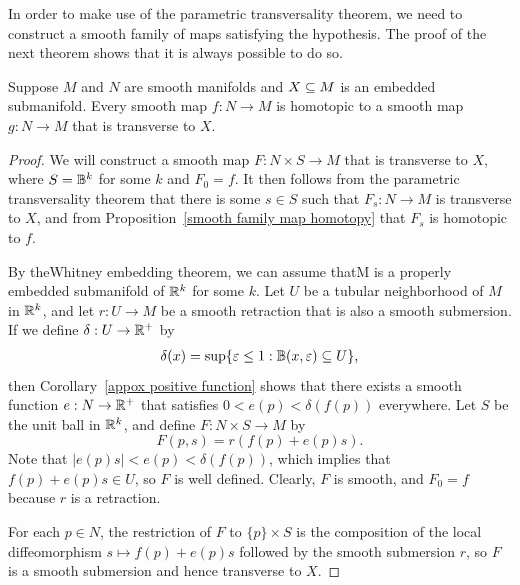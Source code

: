 In order to make use of the parametric transversality theorem, we need to construct
a smooth family of maps satisfying the hypothesis. The proof of the next
theorem shows that it is always possible to do so.
\begin{theorem}
Suppose $M$ and $N$ are smooth manifolds and $X\subseteq M$ is an embedded submanifold. Every smooth map $f:N\to M$ is homotopic to a smooth map $g:N\to M$ that is transverse to $X$.
\end{theorem}
\begin{proof}
We will construct a smooth map $F:N\times S\to M$ that is transverse to $X$, where $S=\mathbb{B}^k$ for some $k$ and $F_0=f$. It then follows from the parametric transversality theorem that there is some $s\in S$ such that $F_s:N\to M$ is transverse to $X$, and from Proposition~\ref{smooth family map homotopy} that $F_s$ is homotopic to $f$.\par
By theWhitney embedding theorem, we can assume thatM is a properly embedded
submanifold of $\mathbb{R}^k$ for some $k$. Let $U$ be a tubular neighborhood of $M$ in $\mathbb{R}^k$, and let $r:U\to M$ be a smooth retraction that is also a smooth submersion. If we define $\delta:U\to\mathbb{R}^+$ by 
\begin{align*}
\delta(x)=\sup\{\varepsilon\leq 1:\mathbb{B}(x,\varepsilon)\subseteq U\},
\end{align*}
then Corollary~\ref{appox positive function} shows that there exists a smooth function $e:N\to\mathbb{R}^+$ that satisfies $0<e(p)<\delta(f(p))$ everywhere. Let $S$ be the unit ball in $\mathbb{R}^k$, and define $F:N\times S\to M$ by
\[F(p,s)=r(f(p)+e(p)s).\]
Note that $|e(p)s|<e(p)<\delta(f(p))$, which implies that $f(p)+e(p)s\in U$, so $F$ is well defined. Clearly, $F$ is smooth, and $F_0=f$ because $r$ is a retraction.\par
For each $p\in N$, the restriction of $F$ to $\{p\}\times S$ is the composition of the local diffeomorphism $s\mapsto f(p)+e(p)s$ followed by the smooth submersion $r$, so $F$ is a smooth submersion and hence transverse to $X$.
\end{proof}
